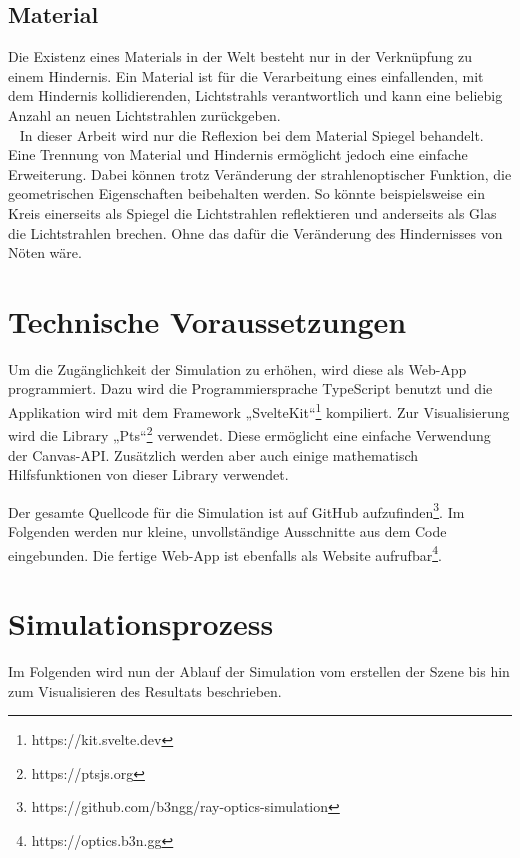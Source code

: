 \section{Material}
\label{material}
Die Existenz eines Materials  in der Welt besteht nur in der Verknüpfung zu einem Hindernis. 
Ein Material ist für die Verarbeitung eines einfallenden, mit dem Hindernis kollidierenden, Lichtstrahls verantwortlich 
und kann eine beliebig Anzahl an neuen Lichtstrahlen zurückgeben. \\ 
In dieser Arbeit wird nur die Reflexion bei dem Material Spiegel  behandelt. 
Eine Trennung von Material und Hindernis ermöglicht jedoch eine einfache Erweiterung.
Dabei können trotz Veränderung der strahlenoptischer Funktion, die geometrischen Eigenschaften beibehalten werden.
So könnte beispielsweise ein Kreis einerseits als Spiegel die Lichtstrahlen reflektieren 
und anderseits als Glas die Lichtstrahlen brechen. Ohne das dafür die Veränderung des Hindernisses von Nöten wäre.


\chapter{Technische Voraussetzungen}
Um die Zugänglichkeit der Simulation zu erhöhen, wird diese als Web-App programmiert. 
Dazu wird die Programmiersprache TypeScript benutzt und die Applikation wird mit dem Framework „SvelteKit“\footnote{https://kit.svelte.dev} kompiliert.
Zur Visualisierung wird die Library „Pts“\footnote{https://ptsjs.org} verwendet. Diese ermöglicht eine einfache Verwendung der Canvas-API. 
Zusätzlich werden aber auch einige mathematisch Hilfsfunktionen von dieser Library verwendet.

Der gesamte Quellcode für die Simulation ist auf GitHub aufzufinden\footnote{https://github.com/b3ngg/ray-optics-simulation}. 
Im Folgenden werden nur kleine, unvollständige Ausschnitte aus dem Code eingebunden. 
Die fertige Web-App ist ebenfalls als Website aufrufbar\footnote{https://optics.b3n.gg}.


\chapter{Simulationsprozess}
Im Folgenden wird nun der Ablauf der Simulation vom erstellen der Szene bis hin zum Visualisieren des Resultats beschrieben.

